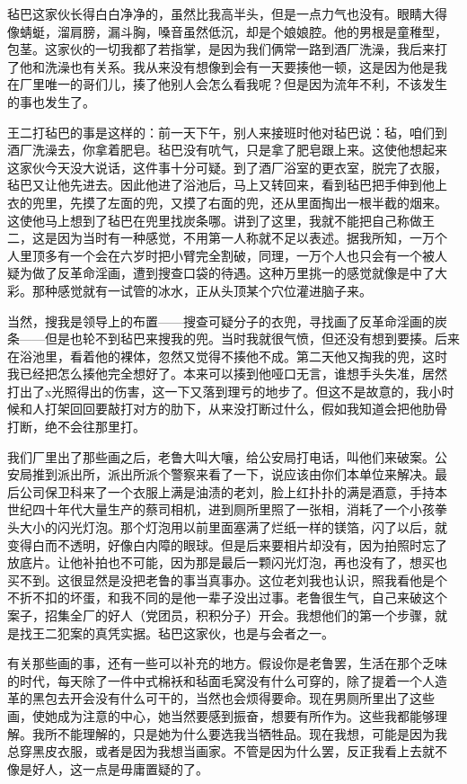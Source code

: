 毡巴这家伙长得白白净净的，虽然比我高半头，但是一点力气也没有。眼睛大得
像蜻蜓，溜肩膀，漏斗胸，嗓音虽然低沉，却是个娘娘腔。他的男根是童稚型，
包茎。这家伙的一切我都了若指掌，是因为我们俩常一路到酒厂洗澡，我后来打
了他和洗澡也有关系。我从来没有想像到会有一天要揍他一顿，这是因为他是我
在厂里唯一的哥们儿，揍了他别人会怎么看我呢？但是因为流年不利，不该发生
的事也发生了。

王二打毡巴的事是这样的：前一天下午，别人来接班时他对毡巴说：毡，咱们到
酒厂洗澡去，你拿着肥皂。毡巴没有吭气，只是拿了肥皂跟上来。这使他想起来
这家伙今天没大说话，这件事十分可疑。到了酒厂浴室的更衣室，脱完了衣服，
毡巴又让他先进去。因此他进了浴池后，马上又转回来，看到毡巴把手伸到他上
衣的兜里，先摸了左面的兜，又摸了右面的兜，还从里面掏出一根半截的烟来。
这使他马上想到了毡巴在兜里找炭条哪。讲到了这里，我就不能把自己称做王
二，这是因为当时有一种感觉，不用第一人称就不足以表述。据我所知，一万个
人里顶多有一个会在六岁时把小臂完全割破，同理，一万个人也只会有一个被人
疑为做了反革命淫画，遭到搜查口袋的待遇。这种万里挑一的感觉就像是中了大
彩。那种感觉就有一试管的冰水，正从头顶某个穴位灌进脑子来。

当然，搜我是领导上的布置——搜查可疑分子的衣兜，寻找画了反革命淫画的炭
条——但是也轮不到毡巴来搜我的兜。当时我就很气愤，但还没有想到要揍。后来
在浴池里，看着他的裸体，忽然又觉得不揍他不成。第二天他又掏我的兜，这时
我已经把怎么揍他完全想好了。本来可以揍到他哑口无言，谁想手头失准，居然
打出了x光照得出的伤害，这一下又落到理亏的地步了。但这不是故意的，我小时
候和人打架回回要敲打对方的肋下，从来没打断过什么，假如我知道会把他肋骨
打断，绝不会往那里打。

我们厂里出了那些画之后，老鲁大叫大嚷，给公安局打电话，叫他们来破案。公
安局推到派出所，派出所派个警察来看了一下，说应该由你们本单位来解决。最
后公司保卫科来了一个衣服上满是油渍的老刘，脸上红扑扑的满是酒意，手持本
世纪四十年代大量生产的蔡司相机，进到厕所里照了一张相，消耗了一个小孩拳
头大小的闪光灯泡。那个灯泡用以前里面塞满了烂纸一样的镁箔，闪了以后，就
变得白而不透明，好像白内障的眼球。但是后来要相片却没有，因为拍照时忘了
放底片。让他补拍也不可能，因为那是最后一颗闪光灯泡，再也没有了，想买也
买不到。这很显然是没把老鲁的事当真事办。这位老刘我也认识，照我看他是个
不折不扣的坏蛋，和我不同的是他一辈子没出过事。老鲁很生气，自己来破这个
案子，招集全厂的好人（党团员，积积分子）开会。我想他们的第一个步骤，就
是找王二犯案的真凭实据。毡巴这家伙，也是与会者之一。

有关那些画的事，还有一些可以补充的地方。假设你是老鲁罢，生活在那个乏味
的时代，每天除了一件中式棉袄和毡面毛窝没有什么可穿的，除了提着一个人造
革的黑包去开会没有什么可干的，当然也会烦得要命。现在男厕所里出了这些
画，使她成为注意的中心，她当然要感到振奋，想要有所作为。这些我都能够理
解。我所不能理解的，只是她为什么要选我当牺牲品。现在我想，可能是因为我
总穿黑皮衣服，或者是因为我想当画家。不管是因为什么罢，反正我看上去就不
像是好人，这一点是毋庸置疑的了。


